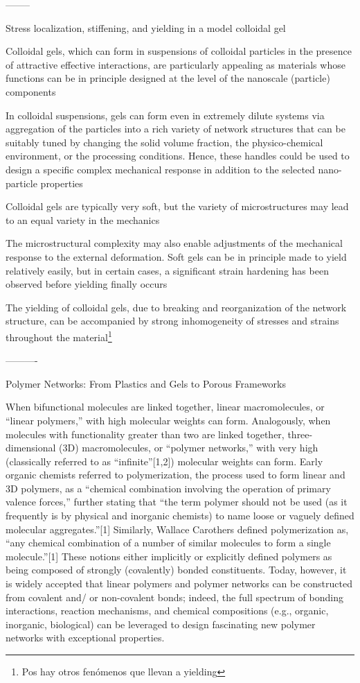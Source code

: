 \documentclass[../../main-notes.tex]{subfiles}
\begin{document}
--------

Stress localization, stiffening, and yielding in a model colloidal gel\citep{colomboStressLocalizationStiffening2014}

Colloidal gels, which can form in suspensions of colloidal particles in the presence of attractive effective interactions, are particularly appealing as materials whose functions can be in principle designed at the level of the nanoscale (particle) components

In colloidal suspensions, gels can form even in extremely dilute systems via aggregation of the particles into a rich variety of network structures that can be suitably tuned by changing the solid volume fraction, the physico-chemical environment, or the processing conditions. Hence, these handles could be used to design a specific complex mechanical response in addition to the selected nano-particle properties

Colloidal gels are typically very soft, but the variety of microstructures may lead to an equal variety in the mechanics

The microstructural complexity may also enable adjustments of the mechanical response to the external deformation. Soft gels can be in principle made to yield relatively easily, but in certain cases, a significant strain hardening has been observed before yielding finally occurs

The yielding of colloidal gels, due to breaking and reorganization of the network structure, can be accompanied by strong inhomogeneity of stresses and strains throughout the material\footnote{Pos hay otros fenómenos que llevan a yielding}

----------

Polymer Networks: From Plastics and Gels to Porous Frameworks\citep{guPolymerNetworksPlastics2020}


When bifunctional molecules are linked together, linear macromolecules, or “linear polymers,” with high molecular weights can form. 
Analogously, when molecules with functionality greater than two are linked together, three-dimensional (3D) macromolecules, or “polymer networks,” with very high (classically referred to as “infinite”[1,2]) molecular weights can form. 
Early organic chemists referred to polymerization, the process used to form linear and 3D polymers, as a “chemical combination involving the operation of primary valence forces,” further stating that “the term polymer should not be used (as it frequently is by physical and inorganic chemists) to name loose or vaguely defined molecular aggregates.”[1] 
Similarly, Wallace Carothers defined polymerization as, “any chemical combination of a number of similar molecules to form a single molecule.”[1] 
These notions either implicitly or explicitly defined polymers as being composed of strongly (covalently) bonded constituents. 
Today, however, it is widely accepted that linear polymers and polymer networks can be constructed from covalent and/ or non-covalent bonds; indeed, the full spectrum of bonding interactions, reaction mechanisms, and chemical compositions (e.g., organic, inorganic, biological) can be leveraged to design fascinating new polymer networks with exceptional properties.
\end{document}
